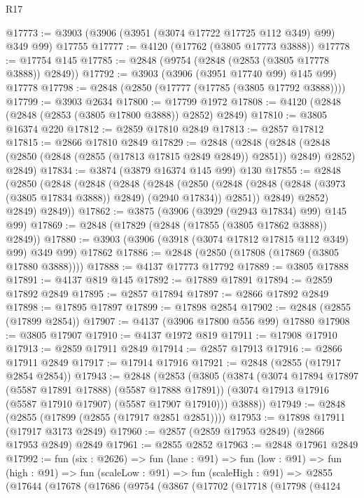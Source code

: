 \begin{lexlean}{R17}
\begin{coremodule}
@17773 := @3903 (@3906 (@3951 (@3074 @17722 @17725 @112 @349) @99) @349 @99) @17755
@17777 := @4120 (@17762 (@3805 @17773 @3888))
@17778 := @17754 @145
@17785 := @2848 (@9754 (@2848 (@2853 (@3805 @17778 @3888)) @2849))
@17792 := @3903 (@3906 (@3951 @17740 @99) @145 @99) @17778
@17798 := @2848 (@2850 (@17777 (@17785 (@3805 @17792 @3888))))
@17799 := @3903 @2634
@17800 := @17799 @1972
@17808 := @4120 (@2848 (@2848 (@2853 (@3805 @17800 @3888)) @2852) @2849)
@17810 := @3805 @16374 @220
@17812 := @2859 @17810 @2849
@17813 := @2857 @17812
@17815 := @2866 @17810 @2849
@17829 := @2848
    (@2848
      (@2848 (@2848 (@2850 (@2848 (@2855 (@17813 @17815 @2849 @2849)) @2851)) @2849) @2852)
      @2849)
@17834 := @3874 (@3879 @16374 @145 @99) @130
@17855 := @2848
    (@2850
      (@2848
        (@2848
          (@2848
            (@2848
              (@2850
                (@2848 (@2848 (@2848 (@3973 (@3805 @17834 @3888)) @2849) (@2940 @17834)) @2851))
              @2849)
            @2852)
          @2849)
        @2849))
@17862 := @3875 (@3906 (@3929 (@2943 @17834) @99) @145 @99)
@17869 := @2848 (@17829 (@2848 (@17855 (@3805 @17862 @3888)) @2849))
@17880 := @3903 (@3906 (@3918 (@3074 @17812 @17815 @112 @349) @99) @349 @99) @17862
@17886 := @2848 (@2850 (@17808 (@17869 (@3805 @17880 @3888))))
@17888 := @4137 @17773 @17792
@17889 := @3805 @17888
@17891 := @4137 @819 @145
@17892 := @17889 @17891
@17894 := @2859 @17892 @2849
@17895 := @2857 @17894
@17897 := @2866 @17892 @2849
@17898 := @17895 @17897
@17899 := @17898 @2854
@17902 := @2848 (@2855 (@17899 @2854))
@17907 := @4137 (@3906 @17800 @556 @99) @17880
@17908 := @3805 @17907
@17910 := @4137 @1972 @819
@17911 := @17908 @17910
@17913 := @2859 @17911 @2849
@17914 := @2857 @17913
@17916 := @2866 @17911 @2849
@17917 := @17914 @17916
@17921 := @2848 (@2855 (@17917 @2854 @2854))
@17943 := @2848
    (@2853
      (@3805
        (@3874
          (@3074 @17894 @17897 (@5587 @17891 @17888) (@5587 @17888 @17891))
          (@3074 @17913 @17916 (@5587 @17910 @17907) (@5587 @17907 @17910)))
        @3888))
@17949 := @2848 (@2855 (@17899 (@2855 (@17917 @2851 @2851))))
@17953 := @17898 @17911 (@17917 @3173 @2849)
@17960 := @2857 (@2859 @17953 @2849) (@2866 @17953 @2849) @2849
@17961 := @2855 @2852
@17963 := @2848 @17961 @2849
@17992 := fun (six : @2626) =>
  fun (lane : @91) =>
  fun (low : @91) =>
  fun (high : @91) =>
  fun (scaleLow : @91) =>
  fun (scaleHigh : @91) =>
  @2855
    (@17644
      (@17678
        (@17686
          (@9754
            (@3867
              (@17702
                (@17718
                  (@17798
                    (@4124

\end{coremodule}
\end{lexlean}
